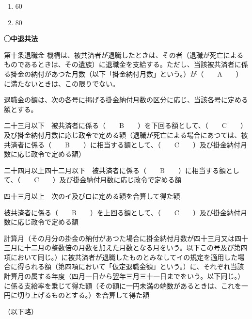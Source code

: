 \begin{answerbox}
  \begin{enumerate}[A:]
    \item 60
    \item 80
  \end{enumerate}
\end{answerbox}


\begin{fillblank}[数理人試験 2020 問題1 設問6 A〜C]
    \noindent \textbf{◯中退共法}
  \begin{lawstructure}
    \begin{lawarticle}{第十条}{退職金}
      機構は、被共済者が退職したときは、その者（退職が死亡によるものであるときは、その遺族）に退職金を支給する。ただし、当該被共済者に係る掛金の納付があつた月数（以下「掛金納付月数」という。）が（　　A　　）に満たないときは、この限りでない。

退職金の額は、次の各号に掲げる掛金納付月数の区分に応じ、当該各号に定める額とする。

二十三月以下　被共済者に係る（　　B　　）を下回る額として、（　　C　　）及び掛金納付月数に応じ政令で定める額（退職が死亡による場合にあつては、被共済者に係る（　　B　　）に相当する額として、（　　C　　）及び掛金納付月数に応じ政令で定める額）

二十四月以上四十二月以下　被共済者に係る（　　B　　）に相当する額として、（　　C　　）及び掛金納付月数に応じ政令で定める額

四十三月以上　次のイ及びロに定める額を合算して得た額

被共済者に係る（　　B　　）を上回る額として、（　　C　　）及び掛金納付月数に応じ政令で定める額

計算月（その月分の掛金の納付があつた場合に掛金納付月数が四十三月又は四十三月に十二月の整数倍の月数を加えた月数となる月をいう。以下この号及び第四項において同じ。）に被共済者が退職したものとみなしてイの規定を適用した場合に得られる額（第四項において「仮定退職金額」という。）に、それぞれ当該計算月の属する年度（四月一日から翌年三月三十一日までをいう。以下同じ。）に係る支給率を乗じて得た額（その額に一円未満の端数があるときは、これを一円に切り上げるものとする。）を合算して得た額

（以下略）
    \end{lawarticle}
  \end{lawstructure}
\end{fillblank}

